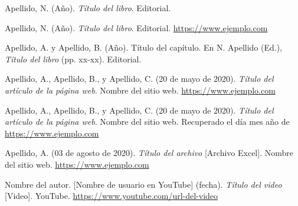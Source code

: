 \hangindent=0.5in
Apellido, N. (Año). \textit{Título del libro}. Editorial.

\hangindent=0.5in
Apellido, N. (Año). \textit{Título del libro}. Editorial. \href{https://www.ejemplo.com}{https://www.ejemplo.com}

\hangindent=0.5in
Apellido, A. y Apellido, B. (Año). Título del capítulo. En N. Apellido (Ed.), \textit{Título del libro} (pp. xx-xx). Editorial.

\hangindent=0.5in
Apellido, A., Apellido, B., y Apellido, C. (20 de mayo de 2020). \textit{Título del artículo de la página web}. Nombre del sitio web. \href{https://www.ejemplo.com}{https://www.ejemplo.com}

\hangindent=0.5in
Apellido, A., Apellido, B., y Apellido, C. (20 de mayo de 2020). \textit{Título del artículo de la página web}. Nombre del sitio web. Recuperado el día mes año de \href{https://www.ejemplo.com}{https://www.ejemplo.com}

\hangindent=0.5in
Apellido, A. (03 de agosto de 2020). \textit{Título del archivo} [Archivo Excel]. Nombre del sitio web. \href{https://www.ejemplo.com}{https://www.ejemplo.com}

\hangindent=0.5in
Nombre del autor. [Nombre de usuario en YouTube] (fecha). \textit{Título del video} [Video]. YouTube. \href{https://www.youtube.com/url-del-video}{https://www.youtube.com/url-del-video}
\pagebreak